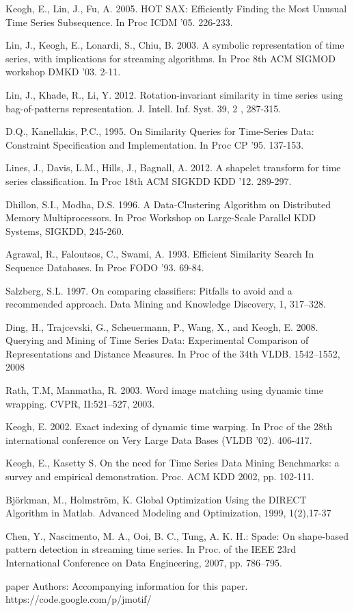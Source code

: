 \documentclass{llncs}
\begin{document}
\begin{thebibliography}{5}
Keogh, E., Lin, J., Fu, A. 2005.
HOT SAX: Efficiently Finding the Most Unusual Time Series Subsequence. 
In Proc ICDM '05. 226-233.

Lin, J., Keogh, E., Lonardi, S., Chiu, B. 2003.
A symbolic representation of time series, with implications for streaming algorithms. 
In Proc 8th ACM SIGMOD workshop DMKD '03. 2-11.

Lin, J., Khade, R., Li, Y. 2012.
Rotation-invariant similarity in time series using bag-of-patterns representation. 
J. Intell. Inf. Syst. 39, 2 , 287-315.

D.Q., Kanellakis, P.C., 1995.
On Similarity Queries for Time-Series Data: Constraint Specification and Implementation. 
In Proc CP '95. 137-153.

Lines, J., Davis, L.M., Hills, J., Bagnall, A. 2012.
A shapelet transform for time series classification. 
In Proc 18th ACM SIGKDD KDD '12. 289-297.

Dhillon, S.I., Modha, D.S. 1996.
A Data-Clustering Algorithm on Distributed Memory Multiprocessors. 
In Proc Workshop on Large-Scale Parallel KDD Systems, SIGKDD, 245-260.

Agrawal, R., Faloutsos, C., Swami, A. 1993.
Efficient Similarity Search In Sequence Databases.
In Proc FODO '93. 69-84.

Salzberg, S.L. 1997.
On comparing classifiers: Pitfalls to avoid and a recommended approach. 
Data Mining and Knowledge Discovery, 1, 317–328.

Ding, H., Trajcevski, G., Scheuermann, P., Wang, X., and Keogh, E. 2008.
Querying and Mining of Time Series Data: Experimental Comparison of Representations and Distance
Measures. 
In Proc of the 34th VLDB. 1542–1552, 2008

Rath, T.M, Manmatha, R. 2003.
Word image matching using dynamic time wrapping. 
CVPR, II:521–527, 2003.

Keogh, E. 2002. 
Exact indexing of dynamic time warping. 
In Proc of the 28th international conference on Very Large Data Bases (VLDB '02). 406-417.

Keogh, E., Kasetty S. 
On the need for Time Series Data Mining Benchmarks: a survey and empirical demonstration.
Proc. ACM KDD 2002, pp. 102-111.

Björkman, M., Holmström, K.
Global Optimization Using the DIRECT Algorithm in Matlab.
Advanced Modeling and Optimization, 1999, 1(2),17-37

Chen, Y., Nascimento, M. A., Ooi, B. C., Tung, A. K. H.:
Spade: On shape-based pattern detection in streaming time series. 
In Proc. of the IEEE 23rd International Conference on Data Engineering, 2007, pp. 786–795.

paper Authors: 
Accompanying information for this paper. 
https://code.google.com/p/jmotif/

\end{thebibliography}
\end{document}
